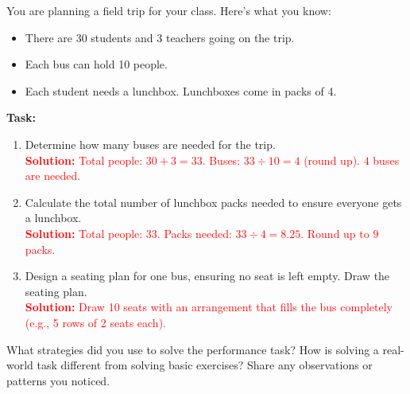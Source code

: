 \documentclass[11pt]{article}
\begin{document}
\begin{tcolorbox}[colframe=black!60, colback=white, 
coltitle=black, colbacktitle=black!15, fonttitle=\bfseries\Large, 
title=Performance Task: Planning a Field Trip, halign title=center, left=10pt, right=10pt, top=10pt, bottom=50pt]
You are planning a field trip for your class. Here’s what you know:
\begin{itemize}
    \item There are 30 students and 3 teachers going on the trip.
    \item Each bus can hold 10 people.
    \item Each student needs a lunchbox. Lunchboxes come in packs of 4.
\end{itemize}
\textbf{Task:}
\begin{enumerate}[itemsep=5em]
    \item Determine how many buses are needed for the trip.\\
    \textcolor{red}{\textbf{Solution:} Total people: \(30 + 3 = 33\). Buses: \(33 \div 10 = 4\) (round up). \(4\) buses are needed.}

    \item Calculate the total number of lunchbox packs needed to ensure everyone gets a lunchbox.\\
    \textcolor{red}{\textbf{Solution:} Total people: \(33\). Packs needed: \(33 \div 4 = 8.25\). Round up to \(9\) packs.}

    \item Design a seating plan for one bus, ensuring no seat is left empty. Draw the seating plan.\\
    \textcolor{red}{\textbf{Solution:} Draw 10 seats with an arrangement that fills the bus completely (e.g., 5 rows of 2 seats each).}
\end{enumerate}
\vspace{5em}
\end{tcolorbox}

\begin{tcolorbox}[colframe=black!60, colback=white, 
coltitle=black, colbacktitle=black!15, fonttitle=\bfseries\Large, 
title=Reflection, halign title=center, left=10pt, right=10pt, top=10pt, bottom=80pt]
What strategies did you use to solve the performance task? How is solving a real-world task different from solving basic exercises? Share any observations or patterns you noticed.

\vspace{1cm}
\end{tcolorbox}
\end{document}
